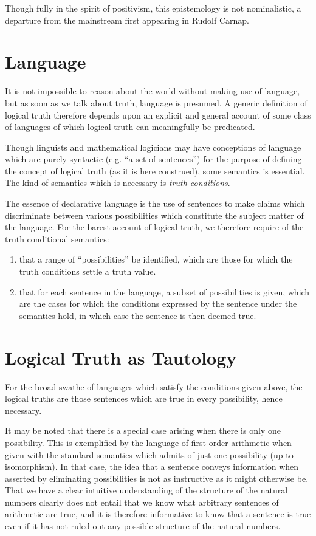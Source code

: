 \documentclass[10pt,titlepage]{book}
\begin{document}
Though fully in the spirit of positivism, this epistemology is not nominalistic, a departure from the mainstream first appearing in Rudolf Carnap.

\section{Language}

It is not impossible to reason about the world without making use of language, but as soon as we talk about truth, language is presumed.
A generic definition of logical truth therefore depends upon an explicit and general account of some class of languages of which logical truth can meaningfully be predicated.

Though linguists and mathematical logicians may have conceptions of language which are purely syntactic (e.g. ``a set of sentences'') for the purpose of defining the concept of logical truth (as it is here construed), some semantics is essential.
The kind of semantics which is necessary is \emph{truth conditions}.

The essence of declarative language is the use of sentences to make claims which discriminate between various possibilities which constitute the subject matter of the language.
For the barest account of logical truth, we therefore require of the truth conditional semantics:

\begin{enumerate}

\item that a range of ``possibilities'' be identified, which are those for which the truth conditions settle a truth value.

\item that for each sentence in the language, a subset of possibilities is given, which are the cases for which the conditions expressed by the sentence under the semantics hold, in which case the sentence is then deemed true.
\end{enumerate}
    
\section{Logical Truth as Tautology}

For the broad swathe of languages which satisfy the conditions given above, the logical truths are those sentences which are true in every possibility, hence necessary.

It may be noted that there is a special case arising when there is only one possibility.
This is exemplified by the language of first order arithmetic when given with the standard semantics which admits of just one possibility (up to isomorphism).
In that case, the idea that a sentence conveys information when asserted by eliminating possibilities is not as instructive as it might otherwise be.
That we have a clear intuitive understanding of the structure of the natural numbers clearly does not entail that we know what arbitrary sentences of arithmetic are true, and it is therefore informative to know that a sentence is true even if it has not ruled out any possible structure of the natural numbers.
\end{document}
